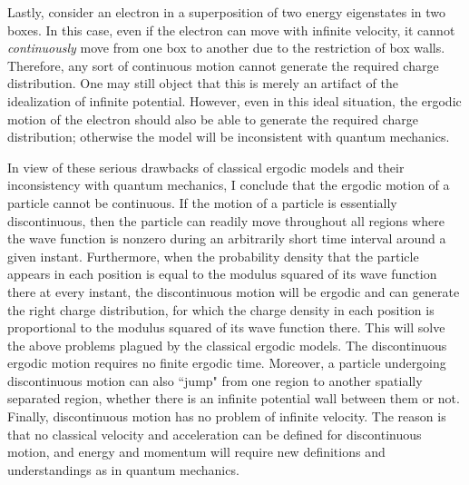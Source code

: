 Lastly, consider an electron in a superposition of two energy eigenstates in two boxes. In this case, even if the electron can move with infinite velocity, it cannot \emph{continuously} move from one box to another due to the restriction of box walls. Therefore, any sort of continuous motion cannot generate the required charge distribution. One may still object that this is merely an artifact of the idealization of infinite potential. However, even in this ideal situation, the ergodic motion of the electron should also be able to generate the required charge distribution; otherwise the model will be inconsistent with quantum mechanics. 

In view of these serious drawbacks of classical ergodic models and their inconsistency with quantum mechanics, I conclude that the ergodic motion of a particle cannot be continuous. If the motion of a particle is essentially discontinuous, then the particle can readily move throughout all regions where the wave function is nonzero during an arbitrarily short time interval around a given instant. Furthermore, when the probability density that the particle appears in each position is equal to the modulus squared of its wave function there at every instant, the discontinuous motion will be ergodic and can generate the right charge distribution, for which the charge density in each position is proportional to the modulus squared of its wave function there. This will solve the above problems plagued by the classical ergodic models. The discontinuous ergodic motion requires no finite ergodic time. Moreover, a particle undergoing discontinuous motion can also ``jump" from one region to another spatially separated region, whether there is an infinite potential wall between them or not. Finally, discontinuous motion has no problem of infinite velocity. The reason is that no classical velocity and acceleration can be defined for discontinuous motion, and energy and momentum will require new definitions and understandings as in quantum mechanics. 


